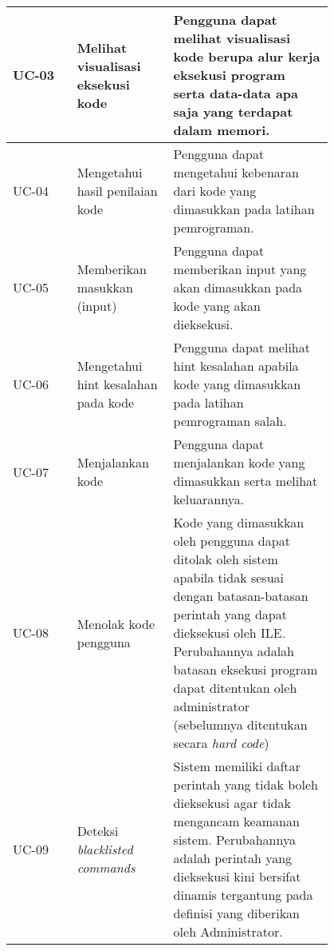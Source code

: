 \begin{longtable}[c]{|l|>{\setlength{\baselineskip}{0.75\baselineskip}}p{0.3\linewidth}|>{\setlength{\baselineskip}{0.75\baselineskip}}p{0.5\linewidth}|}
  UC-03       & Melihat visualisasi eksekusi kode              & Pengguna dapat melihat visualisasi kode berupa alur kerja eksekusi program serta data-data apa saja yang terdapat dalam memori.                                                                                                                                                      \\ \hline
  UC-04       & Mengetahui hasil penilaian kode                & Pengguna dapat mengetahui kebenaran dari kode yang dimasukkan pada latihan pemrograman.                                                                                                                                                                                              \\ \hline
  UC-05       & Memberikan masukkan (input)                    & Pengguna dapat memberikan input yang akan dimasukkan pada kode yang akan dieksekusi.                                                                                                                                                                                                 \\ \hline
  UC-06       & Mengetahui hint kesalahan pada kode            & Pengguna dapat melihat hint kesalahan apabila kode yang dimasukkan pada latihan pemrograman salah.                                                                                                                                                                                   \\ \hline
  UC-07       & Menjalankan kode                               & Pengguna dapat menjalankan kode yang dimasukkan serta melihat keluarannya.                                                                                                                                                                                                           \\ \hline
  UC-08       & Menolak kode pengguna                          & Kode yang dimasukkan oleh pengguna dapat ditolak oleh sistem apabila tidak sesuai dengan batasan-batasan perintah yang dapat dieksekusi oleh ILE. Perubahannya adalah batasan eksekusi program dapat ditentukan oleh administrator (sebelumnya ditentukan secara \textit{hard code}) \\ \hline
  UC-09       & Deteksi \textit{blacklisted commands}          & Sistem memiliki daftar perintah yang tidak boleh dieksekusi agar tidak mengancam keamanan sistem. Perubahannya adalah perintah yang dieksekusi kini bersifat dinamis tergantung pada definisi yang diberikan oleh Administrator.                                                     \\ \hline

\end{longtable}
